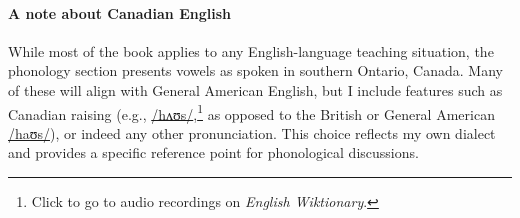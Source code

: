 \paragraph*{A note about Canadian English}

While most of the book applies to any English-language teaching situation, the phonology section presents vowels as spoken in southern Ontario, Canada. Many of these will align with General American English, but I include features such as Canadian raising (e.g., \href{https://en.wiktionary.org/wiki/File:En-ca-raising-house.ogg}{/hʌʊs/},\footnote{Click to go to audio recordings on \textit{English Wiktionary}.} as opposed to the British or General American \href{https://en.wiktionary.org/wiki/File:en-us-house-noun.ogg}{/haʊs/}), or indeed any other pronunciation. This choice reflects my own dialect and provides a specific reference point for phonological discussions.